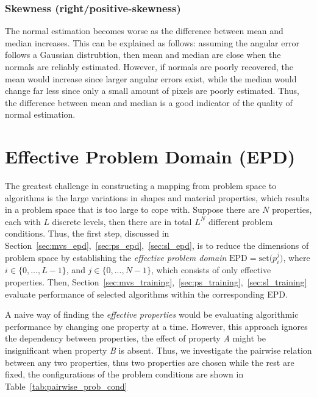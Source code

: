 \subsubsection{Skewness (right/positive-skewness)}
The normal estimation becomes worse as the difference between mean and median increases. This can be explained as follows: assuming the angular error follows a Gaussian distrubtion, then mean and median are close when the normals are reliably estimated. However, if normals are poorly recovered, the mean would increase since larger angular errors exist, while the median would change far less since only a small amount of pixels are poorly estimated. Thus, the difference between mean and median is a good indicator of the quality of normal estimation.

\section{Effective Problem Domain (EPD)}
The greatest challenge in constructing a mapping from problem space to algorithms is the large variations in shapes and material properties, which results in a problem space that is too large to cope with. Suppose there are $N$ properties, each with $L$ discrete levels, then there are in total $L^N$ different problem conditions. Thus, the first step, discussed in Section~\ref{sec:mvs_epd},~\ref{sec:ps_epd},~\ref{sec:sl_epd}, is to reduce the dimensions of problem space by establishing the \textit{effective problem domain} $\text{EPD}=\text{set(}p_i^j\text{)}$, where $i\in\{0, ..., L-1\}$, and $j\in \{0, ..., N-1\}$, which consists of only effective properties. Then, Section~\ref{sec:mvs_training},~\ref{sec:ps_training},~\ref{sec:sl_training} evaluate performance of selected algorithms within the corresponding EPD.

A naive way of finding the \textit{effective properties} would be evaluating algorithmic performance by changing one property at a time. However, this approach ignores the dependency between properties, \ie the effect of property \textit{A} might be insignificant when property \textit{B} is absent. Thus, we investigate the pairwise relation between any two properties, thus two properties are chosen while the rest are fixed, the configurations of the problem conditions are shown in Table~\ref{tab:pairwise_prob_cond}

